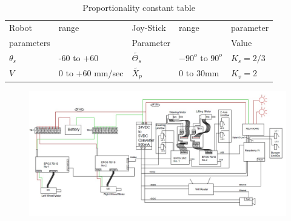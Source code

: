 \begin{table}[!htbp]
	\caption{Proportionality constant table}
	\centering
	\begin{tabular}{l l l l l}
		\hline
		Robot  & range & Joy-Stick& range & parameter \\
		parameters& & Parameter & & Value\\
		\hline
		$\theta_s$ & -60 to +60 & $\tilde{\Theta_s}$ & $-90^o$ to $90^o$ & $K_s=2/3$\\
		$V$ & 0 to +60 mm/sec & $\tilde{X_p}$ & 0 to 30mm & $K_v=2$\\
		\hline
	\end{tabular}	
\end{table}

\begin{figure}
	\includegraphics[width=\linewidth,keepaspectratio]{Chapter5/fig/RobotSideWiring}
	\label{fig:wiring} 
\end{figure} 
